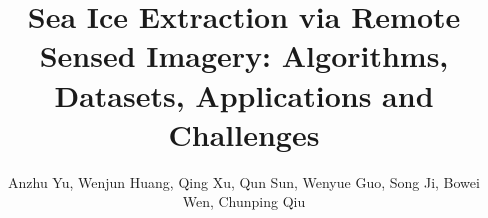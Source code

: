 %
%






\documentclass[journal]{IEEEtran}

\usepackage{xcolor,soul,framed} %

\usepackage[pdftex]{graphicx}
\graphicspath{{../pdf/}{../jpeg/}}

\usepackage[cmex10]{amsmath}
\usepackage{array}
\usepackage{mdwmath}
\usepackage{mdwtab}
\usepackage{eqparbox}
\usepackage{url}
\usepackage{booktabs}    %

\usepackage{multirow}
\usepackage{cite}
\usepackage{float}%
\usepackage{booktabs}
\usepackage{makecell}
\usepackage{hyperref}

\ifCLASSOPTIONcompsoc
\usepackage[caption=false, font=normalsize, labelfont=sf, textfont=sf]{subfig}
\else
\usepackage[caption=false, font=footnotesize]{subfig}

\usepackage{hyperref}
\hypersetup{
	colorlinks=true,
	linkcolor=cyan,
	filecolor=blue,      
	urlcolor=red,
	citecolor=green,
}






    \title{Sea Ice Extraction via Remote Sensed Imagery: Algorithms, Datasets, Applications and Challenges}
 
  \author{Anzhu Yu,  Wenjun Huang, Qing Xu,  Qun Sun,
      Wenyue Guo, Song Ji, Bowei Wen, Chunping Qiu
}


